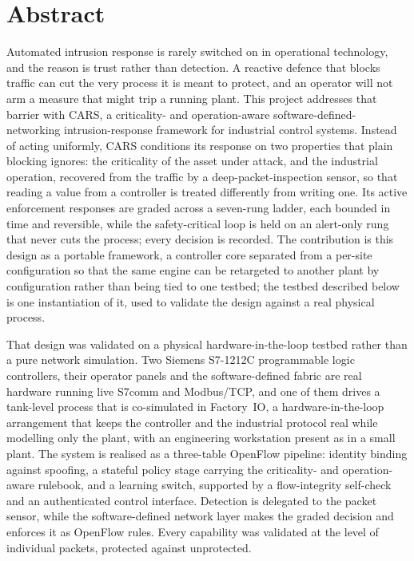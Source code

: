 \chapter*{Abstract}
\noindent
Automated intrusion response is rarely switched on in operational technology, and the reason is trust rather than detection. A reactive defence that blocks traffic can cut the very process it is meant to protect, and an operator will not arm a measure that might trip a running plant. This project addresses that barrier with CARS, a criticality- and operation-aware software-defined-networking intrusion-response framework for industrial control systems. Instead of acting uniformly, CARS conditions its response on two properties that plain blocking ignores: the criticality of the asset under attack, and the industrial operation, recovered from the traffic by a deep-packet-inspection sensor, so that reading a value from a controller is treated differently from writing one. Its active enforcement responses are graded across a seven-rung ladder, each bounded in time and reversible, while the safety-critical loop is held on an alert-only rung that never cuts the process; every decision is recorded. The contribution is this design as a portable framework, a controller core separated from a per-site configuration so that the same engine can be retargeted to another plant by configuration rather than being tied to one testbed; the testbed described below is one instantiation of it, used to validate the design against a real physical process.

That design was validated on a physical hardware-in-the-loop testbed rather than a pure network simulation. Two Siemens S7-1212C programmable logic controllers, their operator panels and the software-defined fabric are real hardware running live S7comm and Modbus/TCP, and one of them drives a tank-level process that is co-simulated in Factory~IO, a hardware-in-the-loop arrangement that keeps the controller and the industrial protocol real while modelling only the plant, with an engineering workstation present as in a small plant. The system is realised as a three-table OpenFlow pipeline: identity binding against spoofing, a stateful policy stage carrying the criticality- and operation-aware rulebook, and a learning switch, supported by a flow-integrity self-check and an authenticated control interface. Detection is delegated to the packet sensor, while the software-defined network layer makes the graded decision and enforces it as OpenFlow rules. Every capability was validated at the level of individual packets, protected against unprotected.

